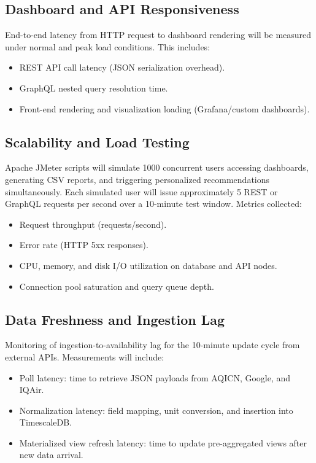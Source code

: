 \subsection{Dashboard and API Responsiveness}
End-to-end latency from HTTP request to dashboard rendering will be measured under normal and peak load conditions. This includes:
\begin{itemize}
    \item REST API call latency (JSON serialization overhead).
    \item GraphQL nested query resolution time.
    \item Front-end rendering and visualization loading (Grafana/custom dashboards).
\end{itemize}

\subsection{Scalability and Load Testing}
Apache JMeter scripts will simulate 1000 concurrent users accessing dashboards, generating CSV reports, and triggering personalized recommendations simultaneously. Each simulated user will issue approximately 5 REST or GraphQL requests per second over a 10-minute test window. Metrics collected:
\begin{itemize}
    \item Request throughput (requests/second).
    \item Error rate (HTTP 5xx responses).
    \item CPU, memory, and disk I/O utilization on database and API nodes.
    \item Connection pool saturation and query queue depth.
\end{itemize}

\subsection{Data Freshness and Ingestion Lag}
Monitoring of ingestion-to-availability lag for the 10-minute update cycle from external APIs. Measurements will include:
\begin{itemize}
    \item Poll latency: time to retrieve JSON payloads from AQICN, Google, and IQAir.
    \item Normalization latency: field mapping, unit conversion, and insertion into TimescaleDB.
    \item Materialized view refresh latency: time to update pre-aggregated views after new data arrival.
\end{itemize}


